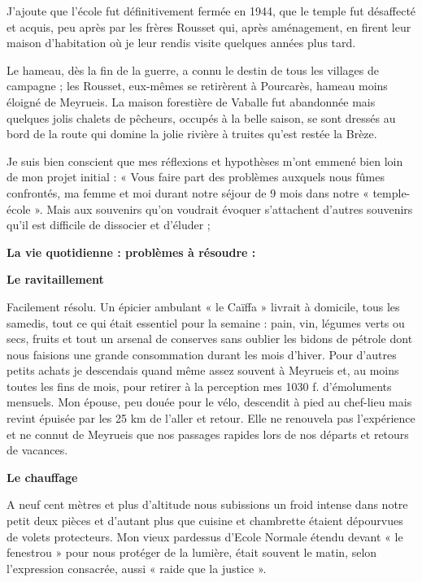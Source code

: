 J’ajoute que l’école fut définitivement fermée en 1944, que le temple fut désaffecté et
acquis, peu après par les frères Rousset qui, après aménagement, en firent leur maison
d’habitation où je leur rendis visite quelques années plus tard.

Le hameau, dès la fin de la guerre, a connu le destin de tous les villages de
campagne ; les Rousset, eux-mêmes se retirèrent à Pourcarès, hameau moins éloigné
de Meyrueis. La maison forestière de Vaballe fut abandonnée mais quelques jolis
chalets de pêcheurs, occupés à la belle saison, se sont dressés au bord de la route qui
domine la jolie rivière à truites qu’est restée la Brèze.

Je suis bien conscient que mes réflexions et hypothèses m’ont emmené bien loin de
mon projet initial : « Vous faire part des problèmes auxquels nous fûmes confrontés,
ma femme et moi durant notre séjour de 9 mois dans notre « temple-école ». Mais aux
souvenirs qu’on voudrait évoquer s’attachent d’autres souvenirs qu’il est difficile de
dissocier et d’éluder ;

\begin{center}
\textbf{La vie quotidienne : problèmes à résoudre :}
\end{center}

\textbf{Le ravitaillement}

Facilement résolu. Un épicier ambulant « le Caïffa » livrait à domicile, tous les
samedis, tout ce qui était essentiel pour la semaine : pain, vin, légumes verts ou secs,
fruits et tout un arsenal de conserves sans oublier les bidons de pétrole dont nous
faisions une grande consommation durant les mois d’hiver.
Pour d’autres petits achats je descendais quand même assez souvent à Meyrueis et, au
moins toutes les fins de mois, pour retirer à la perception mes 1030 f. d’émoluments
mensuels. Mon épouse, peu douée pour le vélo, descendit à pied au chef-lieu mais
revint épuisée par les 25 km de l’aller et retour. Elle ne renouvela pas l’expérience et
ne connut de Meyrueis que nos passages rapides lors de nos départs et retours de
vacances.

\textbf{Le chauffage}

A neuf cent mètres et plus d’altitude nous subissions un froid intense dans notre petit
deux pièces et d’autant plus que cuisine et chambrette étaient dépourvues de volets
protecteurs. Mon vieux pardessus d’Ecole Normale étendu devant « le fenestrou »
pour nous protéger de la lumière, était souvent le matin, selon l’expression consacrée,
aussi « raide que la justice ».

